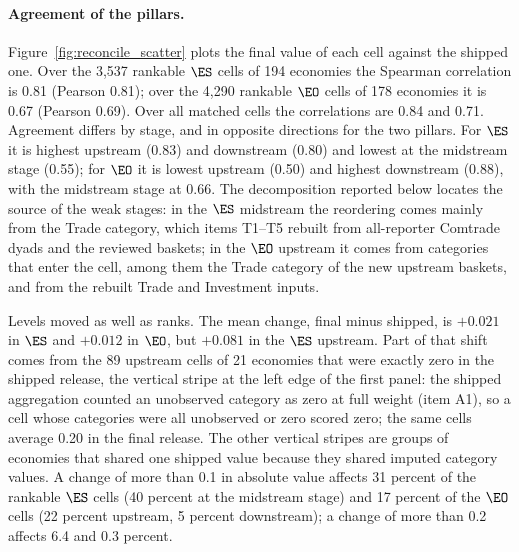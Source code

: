\paragraph{Agreement of the pillars.} Figure~\ref{fig:reconcile_scatter} plots the final value
of each cell against the shipped one. Over the 3{,}537 rankable $\ES$ cells of 194 economies the
Spearman correlation is 0.81 (Pearson 0.81); over the 4{,}290 rankable $\EO$ cells of 178
economies it is 0.67 (Pearson 0.69). Over all matched cells the correlations are 0.84 and 0.71.
Agreement differs by stage, and in opposite directions for the two pillars. For $\ES$ it is
highest upstream (0.83) and downstream (0.80) and lowest at the midstream stage (0.55); for
$\EO$ it is lowest upstream (0.50) and highest downstream (0.88), with the midstream stage at
0.66. The decomposition reported below locates the source of the weak stages: in the $\ES$
midstream the reordering comes mainly from the Trade category, which items T1--T5 rebuilt from
all-reporter Comtrade dyads and the reviewed baskets; in the $\EO$ upstream it comes from
categories that enter the cell, among them the Trade category of the new upstream baskets, and
from the rebuilt Trade and Investment inputs.

Levels moved as well as ranks. The mean change, final minus shipped, is $+0.021$ in $\ES$ and
$+0.012$ in $\EO$, but $+0.081$ in the $\ES$ upstream. Part of that shift comes from the 89
upstream cells of 21 economies that were exactly zero in the shipped release, the vertical stripe
at the left edge of the first panel: the shipped aggregation counted an unobserved category as
zero at full weight (item A1), so a cell whose categories were all unobserved or zero scored zero;
the same cells average 0.20 in the final release. The other vertical stripes are groups of
economies that shared one shipped value because they shared imputed category values. A change of
more than 0.1 in absolute value affects 31 percent of the rankable $\ES$ cells (40 percent at the
midstream stage) and 17 percent of the $\EO$ cells (22 percent upstream, 5 percent downstream);
a change of more than 0.2 affects 6.4 and 0.3 percent.

